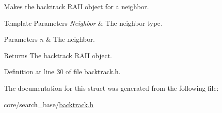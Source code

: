 Makes the backtrack R\+A\+II object for a neighbor. 


\begin{DoxyTemplParams}{Template Parameters}
{\em Neighbor} & The neighbor type. \\
\hline
\end{DoxyTemplParams}

\begin{DoxyParams}{Parameters}
{\em n} & The neighbor. \\
\hline
\end{DoxyParams}
\begin{DoxyReturn}{Returns}
The backtrack R\+A\+II object. 
\end{DoxyReturn}


Definition at line 30 of file backtrack.\+h.



The documentation for this struct was generated from the following file\+:\begin{DoxyCompactItemize}
\item 
core/search\+\_\+base/\hyperlink{backtrack_8h}{backtrack.\+h}\end{DoxyCompactItemize}
